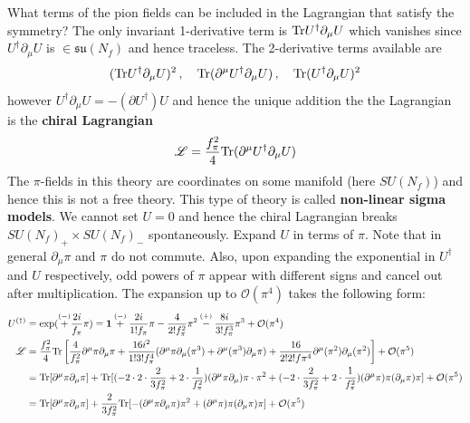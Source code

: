 What terms of the pion fields can be included in the Lagrangian that satisfy the symmetry? The only invariant 1-derivative term is ${\text{Tr}} U^\dagger\partial_\mu U$ which vanishes since $U^\dagger\partial_\mu U$ is $\in\mathfrak{su}(N_f)$ and hence traceless. The 2-derivative terms available are
\begin{equation}
    ({\text{Tr}} U^\dagger\partial_\mu U)^2\,,\quad{\text{Tr}}(\partial^\mu U^\dagger\partial_\mu U)\,,\quad{\text{Tr}}(U^\dagger\partial_\mu U)^2
\end{equation}
however $U^\dagger \partial_\mu U=-(\partial U^\dagger)U$ and hence the unique addition the the Lagrangian is the \textbf{chiral Lagrangian} 
\begin{equation}
    \mathscr{L}=\frac{f_\pi^2}{4}{\text{Tr}}(\partial^\mu U^\dagger\partial_\mu U)
\end{equation}
The $\pi$-fields in this theory are coordinates on some manifold (here $SU(N_f)$) and hence this is not a free theory. This type of theory is called \textbf{non-linear sigma models}. We cannot set $U=0$ and hence the chiral Lagrangian breaks $SU(N_f)_+\times SU(N_f)_-$ spontaneously. Expand $U$ in terms of $\pi$. Note that in general $\partial_\mu\pi$ and $\pi$ do not commute. Also, upon expanding the exponential in $U^\dagger$ and $U$ respectively, odd powers of $\pi$ appear with different signs and cancel out after multiplication. The expansion up to $\mathcal{O}(\pi^4)$ takes the following form:
\begin{subequations}
    \begin{align}
        U^{(\dagger)} & =\exp(\overset{(-)}{+}\frac{2{i}}{f_\pi}\pi)={\boldsymbol{1}}\overset{(-)}{+}\frac{2{i}}{1!f_\pi}\pi-\frac{4}{2!f_\pi^2}\pi^2\overset{(+)}{-}\frac{8{i}}{3!f_\pi^3}\pi^3+\mathcal{O}(\pi^4)                                                                         \\
        \mathscr{L}   & =\frac{f_\pi^2}{4}{\text{Tr}}\left[\frac{4}{f_\pi^2}\partial^\mu\pi\partial_\mu\pi+\frac{16{i}^2}{1!3!f_\pi^4}(\partial^\mu\pi\partial_\mu(\pi^3)+\partial^\mu(\pi^3)\partial_\mu\pi)+\frac{16}{2!2!f\pi^4}\partial^\mu(\pi^2)\partial_\mu(\pi^2)\right]+\mathcal{O}(\pi^5) \\
                      & ={\text{Tr}}[\partial^\mu\pi\partial_\mu\pi]+{\text{Tr}}[(-2\cdot2\cdot\frac{2}{3f_\pi^2}+2\cdot\frac{1}{f_\pi^2})(\partial^\mu\pi\partial_\mu)\pi\cdot\pi^2+(-2\cdot\frac{2}{3f_\pi^2}+2\cdot\frac{1}{f_\pi^2})(\partial^\mu\pi)\pi(\partial_\mu\pi)\pi]+\mathcal{O}(\pi^5)           \\
                      & ={\text{Tr}}[\partial^\mu\pi\partial_\mu\pi]+\frac{2}{3f_\pi^2}{\text{Tr}}[-(\partial^\mu\pi\partial_\mu\pi)\pi^2+(\partial^\mu\pi)\pi(\partial_\mu\pi)\pi]+\mathcal{O}(\pi^5)
    \end{align}
\end{subequations}
